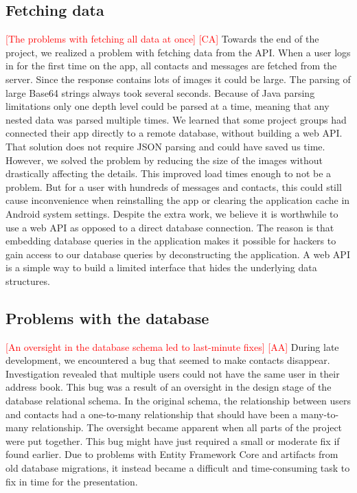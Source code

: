 \documentclass[acmlarge, review=false, screen=true]{acmart}
\begin{document}
    \subsection{Fetching data}
      \textcolor{red}{[The problems with fetching all data at once] [CA]} \newline
      Towards the end of the project, we realized a problem with fetching data from the API. When a user logs in for the first time on the app, all contacts and messages are fetched from the server. Since the response contains lots of images it could be large. The parsing of large Base64 strings always took several seconds. Because of Java parsing limitations only one depth level could be parsed at a time, meaning that any nested data was parsed multiple times. We learned that some project groups had connected their app directly to a remote database, without building a web API. That solution does not require JSON parsing and could have saved us time. However, we solved the problem by reducing the size of the images without drastically affecting the details. This improved load times enough to not be a problem. But for a user with hundreds of messages and contacts, this could still cause inconvenience when reinstalling the app or clearing the application cache in Android system settings. Despite the extra work, we believe it is worthwhile to use a web API as opposed to a direct database connection. The reason is that embedding database queries in the application makes it possible for hackers to gain access to our database queries by deconstructing the application. A web API is a simple way to build a limited interface that hides the underlying data structures.


    \subsection{Problems with the database}
      \textcolor{red}{[An oversight in the database schema led to last-minute fixes] [AA]} \newline
      During late development, we encountered a bug that seemed to make contacts disappear. Investigation revealed that multiple users could not have the same user in their address book. This bug was a result of an oversight in the design stage of the database relational schema. In the original schema, the relationship between users and contacts had a one-to-many relationship that should have been a many-to-many relationship. The oversight became apparent when all parts of the project were put together. This bug might have just required a small or moderate fix if found earlier. Due to problems with Entity Framework Core\cite{adodotnet} and artifacts from old database migrations, it instead became a difficult and time-consuming task to fix in time for the presentation.
\end{document}
